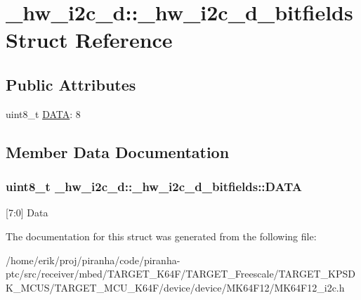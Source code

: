 \hypertarget{struct__hw__i2c__d_1_1__hw__i2c__d__bitfields}{}\section{\+\_\+hw\+\_\+i2c\+\_\+d\+:\+:\+\_\+hw\+\_\+i2c\+\_\+d\+\_\+bitfields Struct Reference}
\label{struct__hw__i2c__d_1_1__hw__i2c__d__bitfields}
\subsection*{Public Attributes}
\begin{DoxyCompactItemize}
\item 
uint8\+\_\+t \hyperlink{struct__hw__i2c__d_1_1__hw__i2c__d__bitfields_ac21cfc958b018c27b68a075dc0b0e695}{D\+A\+TA}\+: 8
\end{DoxyCompactItemize}


\subsection{Member Data Documentation}
\subsubsection[{\texorpdfstring{D\+A\+TA}{DATA}}]{\setlength{\rightskip}{0pt plus 5cm}uint8\+\_\+t \+\_\+hw\+\_\+i2c\+\_\+d\+::\+\_\+hw\+\_\+i2c\+\_\+d\+\_\+bitfields\+::\+D\+A\+TA}\hypertarget{struct__hw__i2c__d_1_1__hw__i2c__d__bitfields_ac21cfc958b018c27b68a075dc0b0e695}{}\label{struct__hw__i2c__d_1_1__hw__i2c__d__bitfields_ac21cfc958b018c27b68a075dc0b0e695}
\mbox{[}7\+:0\mbox{]} Data 

The documentation for this struct was generated from the following file\+:\begin{DoxyCompactItemize}
\item 
/home/erik/proj/piranha/code/piranha-\/ptc/src/receiver/mbed/\+T\+A\+R\+G\+E\+T\+\_\+\+K64\+F/\+T\+A\+R\+G\+E\+T\+\_\+\+Freescale/\+T\+A\+R\+G\+E\+T\+\_\+\+K\+P\+S\+D\+K\+\_\+\+M\+C\+U\+S/\+T\+A\+R\+G\+E\+T\+\_\+\+M\+C\+U\+\_\+\+K64\+F/device/device/\+M\+K64\+F12/M\+K64\+F12\+\_\+i2c.\+h\end{DoxyCompactItemize}
